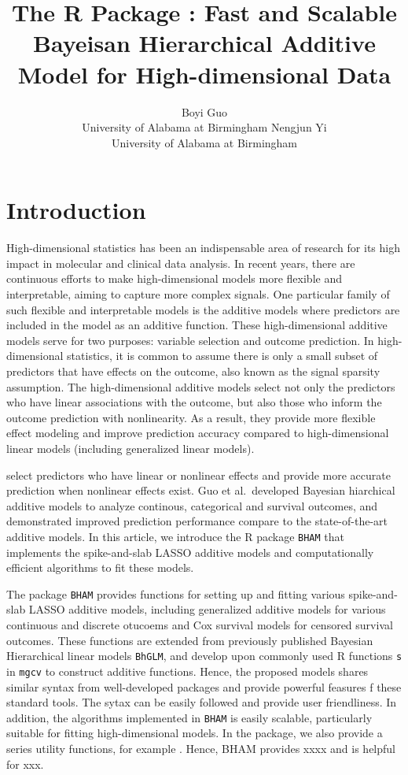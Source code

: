 \documentclass[
]{jss}
\author{
Boyi Guo\\University of Alabama at Birmingham \And Nengjun
Yi\\University of Alabama at Birmingham
}
\title{The R Package \pkg{BHAM}: Fast and Scalable Bayeisan Hierarchical
Additive Model for High-dimensional Data}
\begin{document}
\newcommand{\pr}{\text{Pr}}
\newcommand{\bs}[1]{\boldsymbol{#1}}
\newcommand{\tp}{*}
\newcommand{\simiid}{\overset{\text{iid}}{\sim}}

\section{Introduction}

High-dimensional statistics has been an indispensable area of research
for its high impact in molecular and clinical data analysis. In recent
years, there are continuous efforts to make high-dimensional models more
flexible and interpretable, aiming to capture more complex signals. One
particular family of such flexible and interpretable models is the
additive models where predictors are included in the model as an
additive function. These high-dimensional additive models serve for two
purposes: variable selection and outcome prediction. In high-dimensional
statistics, it is common to assume there is only a small subset of
predictors that have effects on the outcome, also known as the signal
sparsity assumption. \citep{buhlmann2011} The high-dimensional additive
models select not only the predictors who have linear associations with
the outcome, but also those who inform the outcome prediction with
nonlinearity. As a result, they provide more flexible effect modeling
and improve prediction accuracy compared to high-dimensional linear
models (including generalized linear models).

select predictors who have linear or nonlinear effects and provide more
accurate prediction when nonlinear effects exist. Guo et al.~developed
Bayesian hiarchical additive models to analyze continous, categorical
and survival outcomes, and demonstrated improved prediction performance
compare to the state-of-the-art additive models. In this article, we
introduce the R package \texttt{BHAM} that implements the spike-and-slab
LASSO additive models and computationally efficient algorithms to fit
these models.

The package \texttt{BHAM} provides functions for setting up and fitting
various spike-and-slab LASSO additive models, including generalized
additive models for various continuous and discrete otucoems and Cox
survival models for censored survival outcomes. These functions are
extended from previously published Bayesian Hierarchical linear models
\texttt{BhGLM}, and develop upon commonly used R functions \texttt{s} in
\texttt{mgcv} to construct additive functions. Hence, the proposed
models shares similar syntax from well-developed packages and provide
powerful feasures f these standard tools. The sytax can be easily
followed and provide user friendliness. In addition, the algorithms
implemented in \texttt{BHAM} is easily scalable, particularly suitable
for fitting high-dimensional models. In the package, we also provide a
series utility functions, for example . Hence, BHAM provides xxxx and is
helpful for xxx.
\end{document}
